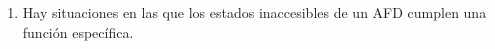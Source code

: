 \begin{enumerate}
        \begin{comment}
        ya que podemos constuir un autómata finito determinista que reconozca dicho lenguaje, como vemos en la Figura~\ref{fig:tipo_test22}, donde hemos hecho uso de la tabla de estados~\ref{tab:estados}:
        \begin{table}[H]
        \centering
        \begin{tabular}{c|c|c|c|c|c|c}
            $7n$ & $7n+1$ & $7n+2$ & $7n+3$ & $7n+4$ & $7n+5$ & $7n+6$ \\
            \hline
            0 & 1 & 2 & 3 & 4 & 5 & 6  
        \end{tabular}
        \caption{Estados en relación a si el número es múltiplo de 7 o si no.}
        \label{tab:estados}
        \end{table}
        Y de las propiedades de los números binarios:
        \begin{itemize}
            \item Leer un 0 es equivalente a multiplicar el número por 2.
            \item Leer un 1 es equivalente a multiplicar el número por 2 y sumarle 1.
        \end{itemize}
        De esta forma, conseguimos el autómata finito determinista anteriormente mencionado, razonando los pasos entre estados.
        \begin{figure}[H]
           \centering
            \begin{tikzpicture}
                \node[state,initial,accepting] (q0) {$q_0$};
                \node[state] (q1) [right of=q0] {$q_1$};
                \node[state] (q2) [above right of=q1] {$q_2$};
                \node[state] (q3) [below right of=q1] {$q_3$};
                \node[state] (q4) [right of=q2] {$q_4$};
                \node[state] (q5) [right of=q3] {$q_5$};
                \node[state] (q6) [right of=q5] {$q_6$};

                \draw   (q0) edge[loop above] node {0} (q0)
                        (q0) edge[above] node {1} (q1)
                        (q1) edge[above] node {0} (q2)
                        (q1) edge[above] node {1} (q3)
                        (q2) edge[above] node {0} (q4)
                        (q2) edge[left, bend left] node[pos=0.8] {1} (q5)
                        (q3) edge[below, bend right] node {0} (q6)
                        (q3) edge[above] node {1} (q0)
                        (q4) edge[above, bend left] node {0} (q1)
                        (q4) edge[above, bend right] node {1} (q2)
                        (q5) edge[above] node {0} (q3)
                        (q5) edge[right] node {1} (q4)
                        (q6) edge[above] node {0} (q5)
                        (q6) edge[loop above] node {1} (q6);
            \end{tikzpicture}
           \caption{Autómata finito determinista para la pregunta 22.}
           \label{fig:tipo_test22}
       \end{figure}
       \end{comment}
    \item Hay situaciones en las que los estados inaccesibles de un AFD cumplen una función específica.\\


\end{enumerate}
